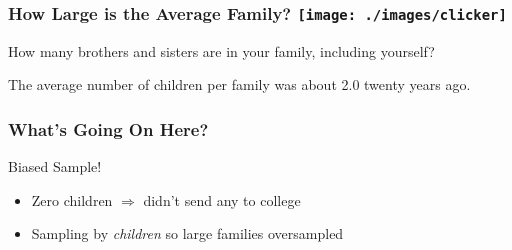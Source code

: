 \documentclass[handout]{beamer}
\begin{document}
\begin{frame}
\frametitle{How Large is the Average Family? \hfill\texttt{[image: ./images/clicker]}}

\Large How many brothers and sisters are in your family, including yourself?

\end{frame}

\begin{frame}
\Large
\alert{The average number of children per family was about 2.0 twenty years ago.}
\end{frame}
\begin{frame}
\frametitle{What's Going On Here?}
\pause
Biased Sample!
\begin{itemize}
 	\item  Zero children $\Rightarrow$ didn't send any to college
 	\item Sampling by \emph{children} so large families \alert{oversampled}
\end{itemize}


\end{frame}
\end{document}
